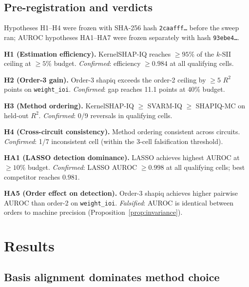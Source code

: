 \documentclass[10pt]{article}
\begin{document}
\subsection{Pre-registration and verdicts}

Hypotheses H1--H4 were frozen with SHA-256 hash
\texttt{2caafff\ldots} before the sweep ran; AUROC hypotheses
HA1--HA7 were frozen separately with hash \texttt{93ebe4\ldots}.

\textbf{H1 (Estimation efficiency).} KernelSHAP-IQ reaches
$\geq 95\%$ of the $k$-SII ceiling at $\geq 5\%$ budget.
\emph{Confirmed}: efficiency $\geq 0.984$ at all qualifying cells.

\textbf{H2 (Order-3 gain).} Order-3 shapiq exceeds the order-2
ceiling by $\geq 5$ $R^2$ points on \texttt{weight\_ioi}.
\emph{Confirmed}: gap reaches 11.1 points at 40\% budget.

\textbf{H3 (Method ordering).} KernelSHAP-IQ $\geq$ SVARM-IQ
$\geq$ SHAPIQ-MC on held-out $R^2$.
\emph{Confirmed}: 0/9 reversals in qualifying cells.

\textbf{H4 (Cross-circuit consistency).} Method ordering consistent
across circuits.
\emph{Confirmed}: 1/7 inconsistent cell (within the 3-cell
falsification threshold).

\textbf{HA1 (LASSO detection dominance).} LASSO achieves highest
AUROC at $\geq 10\%$ budget.
\emph{Confirmed}: LASSO AUROC $\geq 0.998$ at all qualifying cells;
best competitor reaches $0.981$.

\textbf{HA5 (Order effect on detection).} Order-3 shapiq achieves
higher pairwise AUROC than order-2 on \texttt{weight\_ioi}.
\emph{Falsified}: AUROC is identical between orders to machine
precision (Proposition~\ref{prop:invariance}).


\section{Results}
\label{sec:results}

\subsection{Basis alignment dominates method choice}
\label{sec:basis-alignment}
\end{document}
